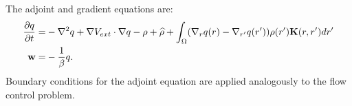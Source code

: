 The adjoint and gradient equations are:
\begin{align*}
\frac{\partial q}{\partial t} =& - \nabla^2 q + \nabla V_{ext} \cdot \nabla q - \rho + \widehat \rho +\int_\Omega (\nabla_r q(r) - \nabla_{r'} q(r') ) \rho(r') \mathbf{K}(r,r') dr'\\
\mathbf{w} =& - \frac{1}{\beta} q.
\end{align*}
Boundary conditions for the adjoint equation are applied analogously to the flow control problem.

